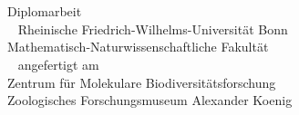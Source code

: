 \begin{center}
\null\vspace{2.23cm}
\textsf{\Huge\textbf{\mytitle}}\\
\vspace{8em}
\large\myself\\
\vfill
\normalsize{Diplomarbeit}\\
~\newline
\small
Rheinische Friedrich-Wilhelms-Universität Bonn\\
Mathematisch-Naturwissenschaftliche Fakultät\\
~\newline
angefertigt am\\
Zentrum für Molekulare Biodiversitätsforschung\\
Zoologisches Forschungsmuseum Alexander Koenig
\end{center}
